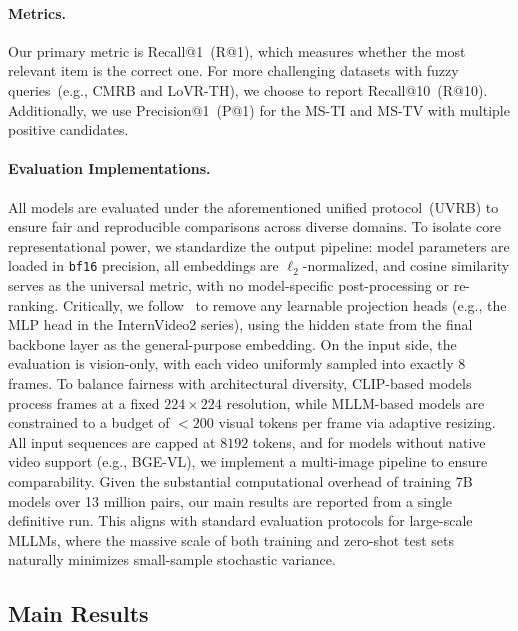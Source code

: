 \FloatBarrier
\paragraph{Metrics.}
Our primary metric is Recall@1~(R@1), which measures whether the most relevant item is the correct one. For more challenging datasets with fuzzy queries~(e.g., CMRB and LoVR-TH), we choose to report Recall@10~(R@10). Additionally, we use Precision@1~(P@1) for the MS-TI and MS-TV with multiple positive candidates.

\paragraph{Evaluation Implementations.}
All models are evaluated under the aforementioned unified protocol~(UVRB) to ensure fair and reproducible comparisons across diverse domains. To isolate core representational power, we standardize the output pipeline: model parameters are loaded in \texttt{bf16} precision, all embeddings are $\ell_2$-normalized, and cosine similarity serves as the universal metric, with no model-specific post-processing or re-ranking. Critically, we follow~\cite{xu2025carebench} to remove any learnable projection heads (e.g., the MLP head in the InternVideo2 series), using the hidden state from the final backbone layer as the general-purpose embedding. On the input side, the evaluation is vision-only, with each video uniformly sampled into exactly $8$ frames. To balance fairness with architectural diversity, CLIP-based models process frames at a fixed $224 \times 224$ resolution, while MLLM-based models are constrained to a budget of $<200$ visual tokens per frame via adaptive resizing. All input sequences are capped at $8192$ tokens, and for models without native video support (e.g., BGE-VL), we implement a multi-image pipeline to ensure comparability. Given the substantial computational overhead of training 7B models over 13 million pairs, our main results are reported from a single definitive run. This aligns with standard evaluation protocols for large-scale MLLMs, where the massive scale of both training and zero-shot test sets naturally minimizes small-sample stochastic variance.

\subsection{Main Results}\label{gve:sec:main_results}

